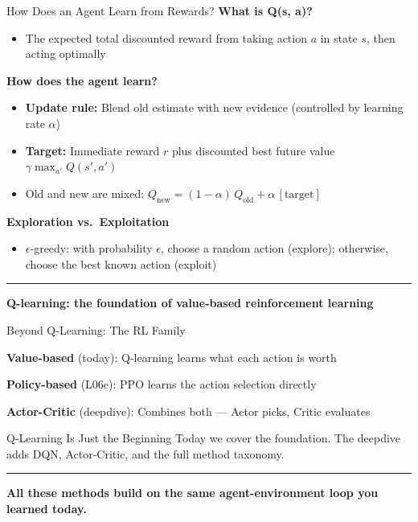 \documentclass[8pt,aspectratio=169]{beamer}
\newcommand{\bottomnote}[1]{%
\vfill
\vspace{-2mm}
\textcolor{mllavender2}{\rule{\textwidth}{0.4pt}}
\vspace{1mm}
\footnotesize
\textbf{#1}
}
\begin{document}
\begin{frame}[t]{How Does an Agent Learn from Rewards?}
\textbf{What is Q(s, a)?}
\begin{itemize}
\item The expected total discounted reward from taking action $a$ in state $s$, then acting optimally
\end{itemize}
\vspace{0.3em}
\textbf{How does the agent learn?}
\begin{itemize}
\item \textbf{Update rule:} Blend old estimate with new evidence (controlled by learning rate $\alpha$)
\item \textbf{Target:} Immediate reward $r$ plus discounted best future value $\gamma \max_{a'} Q(s', a')$
\item Old and new are mixed: $Q_{\text{new}} = (1-\alpha)\,Q_{\text{old}} + \alpha\,[\text{target}]$
\end{itemize}
\vspace{0.3em}
\textbf{Exploration vs.\ Exploitation}
\begin{itemize}
\item $\epsilon$-greedy: with probability $\epsilon$, choose a random action (explore); otherwise, choose the best known action (exploit)
\end{itemize}
\bottomnote{Q-learning: the foundation of value-based reinforcement learning}
\end{frame}

\begin{frame}[t]{Beyond Q-Learning: The RL Family}
\begin{compactlist}
  \item \textbf{Value-based} (today): Q-learning learns what each action is worth
  \item \textbf{Policy-based} (L06e): PPO learns the action selection directly
  \item \textbf{Actor-Critic} (deepdive): Combines both --- Actor picks, Critic evaluates
\end{compactlist}
\vspace{0.5em}
\begin{block}{Q-Learning Is Just the Beginning}
Today we cover the foundation. The deepdive adds DQN, Actor-Critic, and the full method taxonomy.
\end{block}
\bottomnote{All these methods build on the same agent-environment loop you learned today.}
\end{frame}
\end{document}
